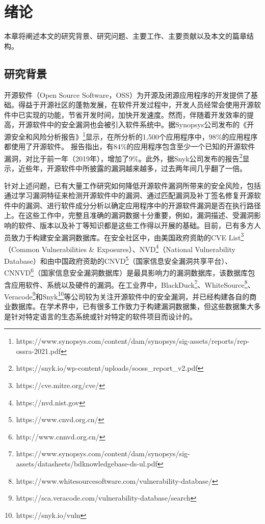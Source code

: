\chapter{绪论}

本章将阐述本文的研究背景、研究问题、主要工作、主要贡献以及本文的篇章结构。

\section{研究背景}

开源软件（Open Source Software，OSS）为开源及闭源应用程序的开发提供了基础。得益于开源社区的蓬勃发展，在软件开发过程中，开发人员经常会使用开源软件中已实现的功能，节省开发时间，加快开发速度。然而，伴随着开发效率的提高，开源软件中的安全漏洞也会被引入软件系统中。据Synopsys公司发布的《开源安全和风险分析报告》\footnote{https://www.synopsys.com/content/dam/synopsys/sig-assets/reports/rep-ossra-2021.pdf}显示，在所分析的1,500个应用程序中，98\%的应用程序都使用了开源软件。
报告指出，有84\%的应用程序包含至少一个已知的开源软件漏洞，对比于前一年（2019年），增加了9\%。此外，据Snyk公司发布的报告\footnote{https://snyk.io/wp-content/uploads/sooss\_report\_v2.pdf}显示，近些年，开源软件中所披露的漏洞越来越多，过去两年间几乎翻了一倍。

针对上述问题，已有大量工作研究如何降低开源软件漏洞所带来的安全风险，包括通过学习漏洞特征来检测开源软件中的漏洞\cite{li2016vulpecker,li2018vuldeepecker,zhou2019devign,jimenez2019importance}、通过匹配漏洞及补丁签名\cite{jang2012redebug, kim2017vuddy, xu2020patch, xiao2020mvp, cui2020vuldetector}修复开源软件中的漏洞\cite{mulliner2013patchdroid, duan2019automating, xu2020automatic, machiry2020spider}、进行软件成分分析以确定应用程序中的开源软件漏洞是否在执行路径上\cite{pashchenko2018vulnerable, ponta2020detection, pashchenko2020vuln4real, Wang2020empirical}。在这些工作中，完整且准确的漏洞数据十分重要，例如，漏洞描述、受漏洞影响的软件、版本以及补丁等知识都是这些工作得以开展的基础。目前，已有多方人员致力于构建安全漏洞数据库。在安全社区中，由美国政府资助的CVE List\footnote{https://cve.mitre.org/cve/}（Common Vulnerabilities \& Exposures）、NVD\footnote{https://nvd.nist.gov}（National Vulnerability Database）和由中国政府资助的CNVD\footnote{https://www.cnvd.org.cn/}（国家信息安全漏洞共享平台）、CNNVD\footnote{http://www.cnnvd.org.cn/}（国家信息安全漏洞数据库）是最具影响力的漏洞数据库，该数据库包含应用软件、系统以及硬件的漏洞。在工业界中，BlackDuck\footnote{https://www.synopsys.com/content/dam/synopsys/sig-assets/datasheets/bdknowledgebase-ds-ul.pdf}、WhiteSource\footnote{https://www.whitesourcesoftware.com/vulnerability-database/}、Veracode\footnote{https://sca.veracode.com/vulnerability-database/search}和Snyk\footnote{https://snyk.io/vuln}等公司较为关注开源软件中的安全漏洞，并已经构建各自的商业数据库。在学术界中，已有很多工作致力于构建漏洞数据集\cite{ponta2019manually,fan2020ac,jimenez2018enabling,gkortzis2018vulinoss,namrud2019androvul}，但这些数据集大多是针对特定语言的生态系统或针对特定的软件项目而设计的。

